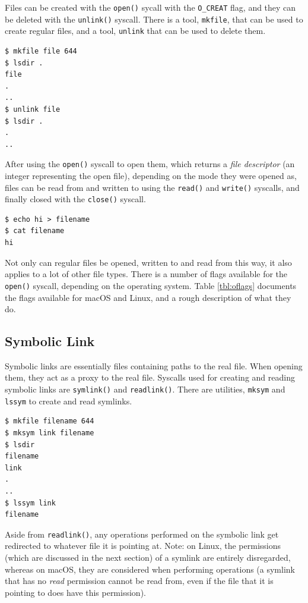 \documentclass[a4paper]{article}
\begin{document}
Files can be created with the \verb|open()| sycall with the \verb|O_CREAT| flag, and they can be deleted with the \verb|unlink()| syscall. There is a tool, \verb|mkfile|, that can be used to create regular files, and a tool, \verb|unlink| that can be used to delete them.

\begin{verbatim}
$ mkfile file 644
$ lsdir .
file
.
..
$ unlink file
$ lsdir .
.
..
\end{verbatim}
After using the \verb|open()| syscall to open them, which returns a \emph{file descriptor} (an integer representing the open file), depending on the mode they were opened as, files can be read from and written to using the \verb|read()| and \verb|write()| syscalls, and finally closed with the \verb|close()| syscall.

\begin{verbatim}
$ echo hi > filename
$ cat filename
hi  
\end{verbatim}
Not only can regular files be opened, written to and read from this way, it also applies to a lot of other file types. There is a number of flags available for the \verb|open()| syscall, depending on the operating system. Table \ref{tbl:oflags} documents the flags available for macOS and Linux, and a rough description of what they do.

\subsection{Symbolic Link}

Symbolic links are essentially files containing paths to the real file. When opening them, they act as a proxy to the real file. Syscalls used for creating and reading symbolic links are \verb|symlink()| and \verb|readlink()|. There are utilities, \verb|mksym| and \verb|lssym| to create and read symlinks.

\begin{verbatim}
$ mkfile filename 644
$ mksym link filename
$ lsdir
filename
link
.
..
$ lssym link
filename  
\end{verbatim}
Aside from \verb|readlink()|, any operations performed on the symbolic link get redirected to whatever file it is pointing at. Note: on Linux, the permissions (which are discussed in the next section) of a symlink are entirely disregarded, whereas on macOS, they are considered when performing operations (a symlink that has no \emph{read} permission cannot be read from, even if the file that it is pointing to does have this permission).
\end{document}
